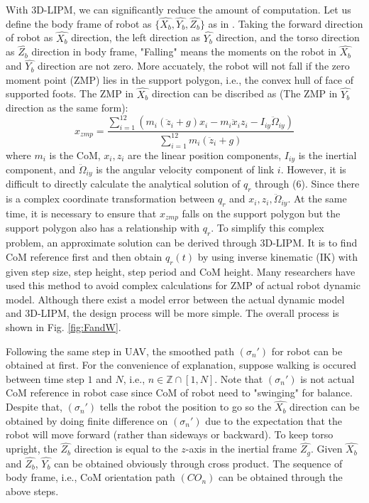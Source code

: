\documentclass{ieeeaccess}
\begin{document}
With 3D-LIPM, we can significantly reduce the amount of computation. Let us define the body frame of robot as $\{ \widehat{X_b}, \widehat{Y_b}, \widehat{Z_b} \}$ as in \cite{ourrobot}. Taking the forward direction of robot as $\widehat{X_b}$ direction, the left direction as $\widehat{Y_b}$ direction, and the torso direction as $\widehat{Z_b}$ direction in body frame, "Falling" means the moments on the robot in $\widehat{X_b}$ and $\widehat{Y_b}$ direction are not zero. More accuately, the robot will not fall if the zero moment point (ZMP) lies in the support polygon, i.e., the convex hull of face of supported foots. The ZMP in $\widehat{X_b}$ direction can be discribed as \cite{huang2001planning} (The ZMP in $\widehat{Y_b}$ direction as the same form):
\begin{equation}
    x_{zmp} = \frac{\sum_{i=1}^{12} (m_i(\ddot{z}_i+g)x_i - m_i\ddot{x}_iz_i - I_{iy}\ddot{\Omega}_{iy})}
                   {\sum_{i=1}^{12} m_i(\ddot{z}_i+g)}
\end{equation}
where $m_i$ is the CoM, $x_i, z_i$ are the linear position components, $I_{iy}$ is the inertial component, and $\ddot{\Omega}_{iy}$ is the angular velocity component of link $i$. However, it is difficult to directly calculate the analytical solution of $q_r$ through (6). Since there is a complex coordinate transformation between $q_r$ and $x_i, z_i, \ddot{\Omega}_{iy}$. At the same time, it is necessary to ensure that $x_{zmp}$ falls on the support polygon but the support polygon also has a relationship with $q_r$. To simplify this complex problem, an approximate solution can be derived through 3D-LIPM. It is to find CoM reference first and then obtain $q_r(t)$ by using inverse kinematic (IK) with given step size, step height, step period and CoM height. Many researchers have used this method to avoid complex calculations for ZMP of actual robot dynamic model. Although there exist a model error between the actual dynamic model and 3D-LIPM, the design process will be more simple. The overall process is shown in Fig. \ref{fig:FandW}.

Following the same step in UAV, the smoothed path $(\sigma_n')$ for robot can be obtained at first. For the convenience of explanation, suppose walking is occured between time step $1$ and $N$, i.e., $n\in\mathbb{Z}\cap[1,N]$. Note that $(\sigma_n')$ is not actual CoM reference in robot case since CoM of robot need to "swinging" for balance. Despite that, $(\sigma_n')$ tells the robot the position to go so the $\widehat{X_b}$ direction can be obtained by doing finite difference on $(\sigma_n')$ due to the expectation that the robot will move forward (rather than sideways or backward). To keep torso upright, the $\widehat{Z_b}$ direction is equal to the $z$-axis in the inertial frame $\widehat{Z_g}$. Given $\widehat{X_b}$ and $\widehat{Z_b}$, $\widehat{Y_b}$ can be obtained obviously through cross product. The sequence of body frame, i.e., CoM orientation path $(CO_n)$ can be obtained through the above steps.
\end{document}
